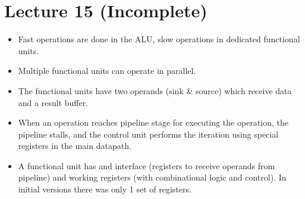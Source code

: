 \documentclass{article}
\begin{document}
\section*{Lecture 15 (Incomplete)}
\begin{itemize}
\item Fast operations are done in the ALU, slow operations in dedicated functional units.
\item Multiple functional units can operate in parallel.
\item The functional units have two operands (sink \& source) which receive data and a result buffer.
\item When an operation reaches pipeline stage for executing the operation, the pipeline stalls, and the control unit performs the iteration using special registers in the main datapath.
\item A functional unit has and interface (registers to receive operands from pipeline) and working registers (with combinational logic and control). In initial versions there was only 1 set of registers.

\end{itemize}
\end{document}
